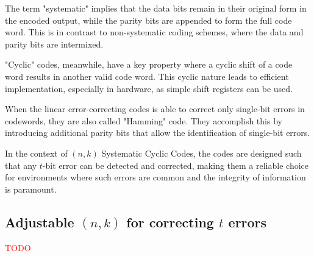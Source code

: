 \documentclass{article}
\begin{document}
The term "systematic" implies that the data bits remain in their original form in the encoded output, while the parity bits are appended to form the full code word. This is in contrast to non-systematic coding schemes, where the data and parity bits are intermixed.

"Cyclic" codes, meanwhile, have a key property where a cyclic shift of a code word results in another valid code word. This cyclic nature leads to efficient implementation, especially in hardware, as simple shift registers can be used.

When the linear error-correcting codes is able to correct only single-bit errors in codewords, they are also called "Hamming" code. They accomplish this by introducing additional parity bits that allow the identification of single-bit errors.

In the context of $(n,k)$ Systematic Cyclic Codes, the codes are designed such that any $t$-bit error can be detected and corrected, making them a reliable choice for environments where such errors are common and the integrity of information is paramount.


\subsection{Adjustable $(n,k)$ for correcting $t$ errors}
\label{sec:adjustable-nk}
\textcolor{red}{TODO}
\end{document}
